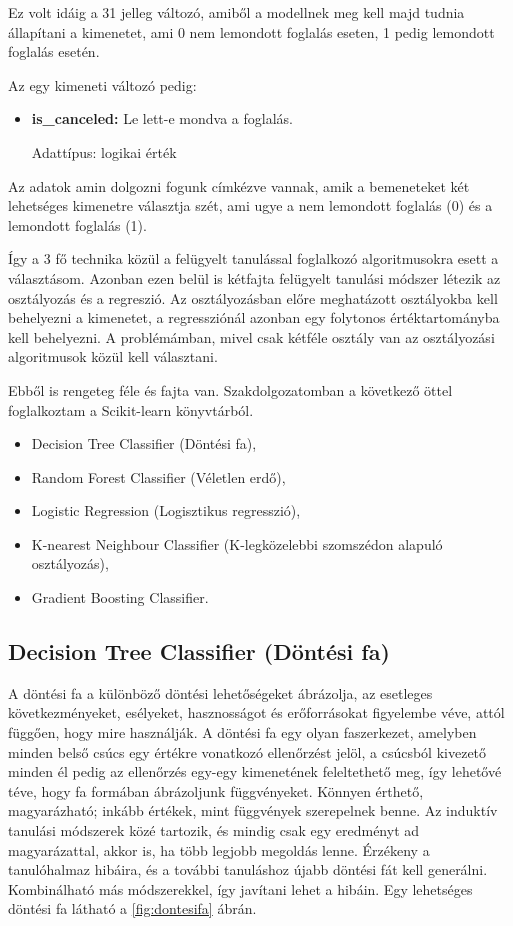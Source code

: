 Ez volt idáig a 31 jelleg változó, amiből a modellnek meg kell majd tudnia állapítani a kimenetet, ami 0 nem lemondott foglalás eseten, 1 pedig lemondott foglalás esetén.

Az egy kimeneti változó pedig:
\begin{itemize}
    \item \textbf{is\_canceled:} Le lett-e mondva a foglalás. 
    
    Adattípus: logikai érték
\end{itemize}

Az adatok amin dolgozni fogunk címkézve vannak, amik a bemeneteket két lehetséges kimenetre választja szét, ami ugye a nem lemondott foglalás (0) és a lemondott foglalás (1).

Így a 3 fő technika közül a felügyelt tanulással foglalkozó algoritmusokra esett a választásom. Azonban ezen belül is kétfajta felügyelt tanulási módszer létezik az osztályozás és a regreszió. Az osztályozásban előre meghatázott osztályokba kell behelyezni a kimenetet, a regressziónál azonban egy folytonos értéktartományba kell behelyezni. A problémámban, mivel csak kétféle osztály van az osztályozási algoritmusok közül kell választani.

Ebből is rengeteg féle és fajta van. Szakdolgozatomban a következő öttel foglalkoztam a Scikit-learn könyvtárból.

\begin{itemize}
    \item Decision Tree Classifier (Döntési fa),
    \item Random Forest Classifier (Véletlen erdő),
    \item Logistic Regression (Logisztikus regresszió),
    \item K-nearest Neighbour Classifier (K-legközelebbi szomszédon alapuló osztályozás),
    \item Gradient Boosting Classifier.
\end{itemize}

\subsection{Decision Tree Classifier (Döntési fa)}
A döntési fa a különböző döntési lehetőségeket ábrázolja, az esetleges következményeket, esélyeket, hasznosságot és erőforrásokat figyelembe véve, attól függően, hogy mire használják. A döntési fa egy olyan faszerkezet, amelyben minden belső csúcs egy értékre vonatkozó ellenőrzést jelöl, a csúcsból kivezető minden él pedig az ellenőrzés egy-egy kimenetének feleltethető meg, így lehetővé téve, hogy fa formában ábrázoljunk függvényeket. Könnyen érthető, magyarázható; inkább értékek, mint függvények szerepelnek benne. Az induktív tanulási módszerek közé tartozik, és mindig csak egy eredményt ad magyarázattal, akkor is, ha több legjobb megoldás lenne. Érzékeny a tanulóhalmaz hibáira, és a további tanuláshoz újabb döntési fát kell generálni. Kombinálható más módszerekkel, így javítani lehet a hibáin. Egy lehetséges döntési fa látható a \ref{fig:dontesifa} ábrán.

